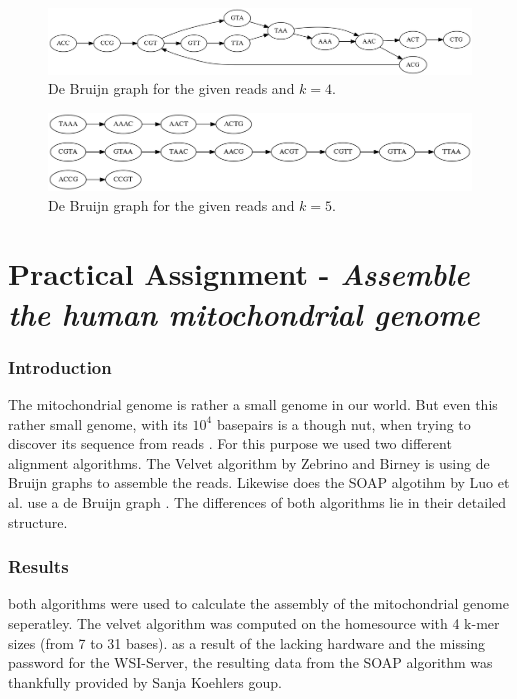\documentclass[%
   10pt,              %
   ngerman,           %
   a4paper,           %
   DIV11,             %
]{scrartcl}%
\begin{document}
\begin{figure}[h]
 \centering
 \includegraphics[width=1\textwidth]{deBruijnGraph_4mere.png}
 \caption{De Bruijn graph for the given reads and $k = 4$.}
 \label{fig:4mere}
\end{figure}

\begin{figure}[h]
 \centering
 \includegraphics[width=1\textwidth]{deBruijnGraph_5mere.png}
 \caption{De Bruijn graph for the given reads and $k = 5$.}
 \label{fig:5mere}
\end{figure}

\section*{Practical Assignment - \textit{Assemble the human mitochondrial genome}}
\subsubsection*{Introduction}
The mitochondrial genome is rather a small genome in our world. But even this rather small genome, with its $10^4$ basepairs is a though nut, when trying to discover its sequence from reads \cite{!!!!}. For this purpose we used two different alignment algorithms. The Velvet algorithm by Zebrino and Birney is using de Bruijn graphs to assemble the reads.\cite{VelvetProgram}
Likewise does the SOAP algotihm by Luo et al. use a de Bruijn graph \cite{SOAPProgram}. The differences of both algorithms lie in their detailed structure.


\subsubsection*{Results}
both algorithms were used to calculate the assembly of the mitochondrial genome seperatley. The velvet algorithm was computed on the homesource with 4 k-mer sizes (from 7 to 31 bases). as a result of the lacking hardware and the missing password for the WSI-Server, the resulting data from the SOAP algorithm was thankfully provided by Sanja Koehlers goup.
\end{document}
